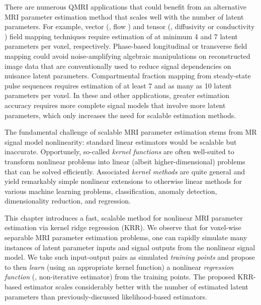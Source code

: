 There are numerous QMRI applications
that could benefit from an alternative MRI parameter estimation method
that scales well with the number of latent parameters.
For example,
vector (\eg, flow \cite{feinberg:85:mri})
and tensor 
(\eg, diffusivity \cite{bihan:01:dti} or conductivity \cite{tuch:01:ctm})
field mapping techniques
require estimation 
of at minimum 4 and 7 latent parameters per voxel,
respectively.
Phase-based longitudinal \cite{sekihara:85:nif} 
or transverse \cite{morrell:08:aps,sacolick:10:bmb} field mapping
could avoid noise-amplifying algebraic manipulations
on reconstructed image data
that are conventionally used
to reduce signal dependencies 
on nuisance latent parameters.
Compartmental fraction mapping \cite{mackay:94:ivv}
from steady-state pulse sequences
requires estimation of at least 7 \cite{deoni:08:gmt}
and as many as 10 \cite{deoni:13:oct}
latent parameters per voxel.
In these and other applications,
greater estimation accuracy
requires more complete signal models
that involve more latent parameters,
which only increases the need 
for scalable estimation methods.


The fundamental challenge 
of scalable MRI parameter estimation
stems from MR signal model nonlinearity:
standard linear estimators
would be scalable but inaccurate.
Opportunely,
so-called \emph{kernel functions} \cite{aronszajn:50:tor}
are often well-suited 
to transform nonlinear problems
into linear (albeit higher-dimensional) problems
that can be solved efficiently. 
Associated \emph{kernel methods} \cite{scholkopf:01:agr}
are quite general
and yield remarkably simple nonlinear extensions
to otherwise linear methods
for various machine learning problems,
\eg classification,
anomaly detection,
dimensionality reduction,
and regression.

This chapter introduces a fast, scalable method 
for nonlinear MRI parameter estimation
via kernel ridge regression (KRR).
We observe that 
for voxel-wise separable MRI parameter estimation problems,
one can rapidly simulate many instances
of latent parameter inputs and signal outputs
from the nonlinear signal model.
We take such input-output pairs
as simulated \emph{training points}
and propose to then \emph{learn}
(using an appropriate kernel function)
a nonlinear \emph{regression function}
(\ie, non-iterative estimator)
from the training points.
The proposed KRR-based estimator scales considerably better
with the number of estimated latent parameters
than previously-discussed likelihood-based estimators.

